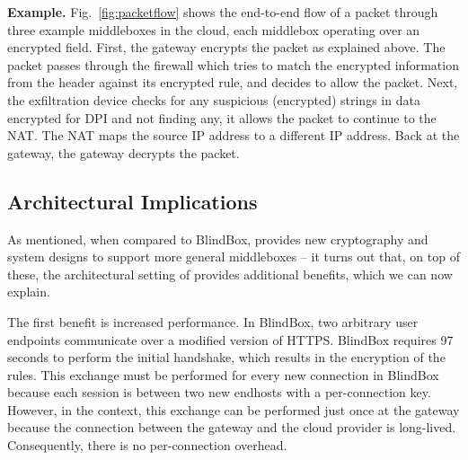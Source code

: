 {\bf Example.} Fig.~\ref{fig:packetflow} shows the end-to-end flow of a packet through three example middleboxes in the cloud, each middlebox operating over an encrypted field.  
First,  the gateway encrypts the packet as explained above. The packet passes through the firewall which tries to match the encrypted information from the header against its encrypted rule, and decides to allow the packet. Next, the exfiltration device checks for any suspicious (encrypted) strings in data encrypted for DPI and not finding any, it allows the packet to continue to the NAT. The NAT maps the source IP address to a different IP address. Back at the gateway, the gateway decrypts the packet. 

\subsection{Architectural Implications} 
\label{sec:bbarch}

As mentioned, when compared to BlindBox, \sys provides new cryptography and system designs to support  more general middleboxes --  it turns out that, on top of these, the architectural setting of \sys provides additional benefits, which we can now explain.


%
The first benefit is increased performance. In BlindBox, two arbitrary user endpoints communicate over a modified version of HTTPS. BlindBox requires 97 seconds to perform the initial handshake, which results in the encryption of the rules. 
This exchange must be performed for every new connection in BlindBox because each session is between two new endhosts with a per-connection key.
However, in the \sys context, this exchange can be performed just once at the gateway because the connection between the gateway and the cloud provider is long-lived. Consequently, there is no per-connection overhead. 


